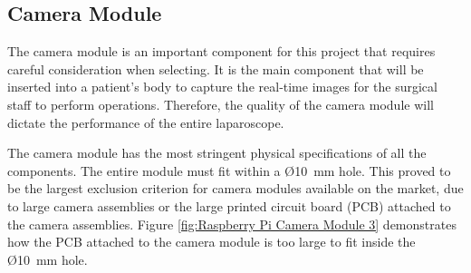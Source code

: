 
\subsection{Camera Module}
\label{sec:Camera Module}

The camera module is an important component for this project that requires careful consideration when selecting. It is the main component that will be inserted into a patient’s body to capture the real‑time images for the surgical staff to perform operations. Therefore, the quality of the camera module will dictate the performance of the entire laparoscope.

The camera module has the most stringent physical specifications of all the components. The entire module must fit within a Ø10~mm hole. This proved to be the largest exclusion criterion for camera modules available on the market, due to large camera assemblies or the large printed circuit board (PCB) attached to the camera assemblies.  Figure \ref{fig:Raspberry Pi Camera Module 3} demonstrates how the PCB attached to the camera module is too large to fit inside the Ø10~mm hole. \citep{AC-RP}

